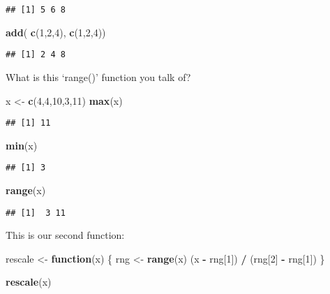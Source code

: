 \documentclass[
]{article}
\newenvironment{Shaded}{\begin{snugshade}}{\end{snugshade}}
\newcommand{\ControlFlowTok}[1]{\textcolor[rgb]{0.13,0.29,0.53}{\textbf{#1}}}
\newcommand{\DecValTok}[1]{\textcolor[rgb]{0.00,0.00,0.81}{#1}}
\newcommand{\KeywordTok}[1]{\textcolor[rgb]{0.13,0.29,0.53}{\textbf{#1}}}
\newcommand{\NormalTok}[1]{#1}
\newcommand{\OperatorTok}[1]{\textcolor[rgb]{0.81,0.36,0.00}{\textbf{#1}}}
\newcommand{\StringTok}[1]{\textcolor[rgb]{0.31,0.60,0.02}{#1}}
\begin{document}
\begin{verbatim}
## [1] 5 6 8
\end{verbatim}

\begin{Shaded}
\begin{Highlighting}[]
\KeywordTok{add}\NormalTok{( }\KeywordTok{c}\NormalTok{(}\DecValTok{1}\NormalTok{,}\DecValTok{2}\NormalTok{,}\DecValTok{4}\NormalTok{), }\KeywordTok{c}\NormalTok{(}\DecValTok{1}\NormalTok{,}\DecValTok{2}\NormalTok{,}\DecValTok{4}\NormalTok{))}
\end{Highlighting}
\end{Shaded}

\begin{verbatim}
## [1] 2 4 8
\end{verbatim}

What is this `range()' function you talk of?

\begin{Shaded}
\begin{Highlighting}[]
\NormalTok{x <-}\StringTok{ }\KeywordTok{c}\NormalTok{(}\DecValTok{4}\NormalTok{,}\DecValTok{4}\NormalTok{,}\DecValTok{10}\NormalTok{,}\DecValTok{3}\NormalTok{,}\DecValTok{11}\NormalTok{)}
\KeywordTok{max}\NormalTok{(x)}
\end{Highlighting}
\end{Shaded}

\begin{verbatim}
## [1] 11
\end{verbatim}

\begin{Shaded}
\begin{Highlighting}[]
\KeywordTok{min}\NormalTok{(x)}
\end{Highlighting}
\end{Shaded}

\begin{verbatim}
## [1] 3
\end{verbatim}

\begin{Shaded}
\begin{Highlighting}[]
\KeywordTok{range}\NormalTok{(x)}
\end{Highlighting}
\end{Shaded}

\begin{verbatim}
## [1]  3 11
\end{verbatim}

This is our second function:

\begin{Shaded}
\begin{Highlighting}[]
\NormalTok{rescale <-}\StringTok{ }\ControlFlowTok{function}\NormalTok{(x) \{}
\NormalTok{ rng <-}\StringTok{ }\KeywordTok{range}\NormalTok{(x)}
\NormalTok{ (x }\OperatorTok{-}\StringTok{ }\NormalTok{rng[}\DecValTok{1}\NormalTok{]) }\OperatorTok{/}\StringTok{ }\NormalTok{(rng[}\DecValTok{2}\NormalTok{] }\OperatorTok{-}\StringTok{ }\NormalTok{rng[}\DecValTok{1}\NormalTok{])}
\NormalTok{\}}

\KeywordTok{rescale}\NormalTok{(x)}
\end{Highlighting}
\end{Shaded}
\end{document}

